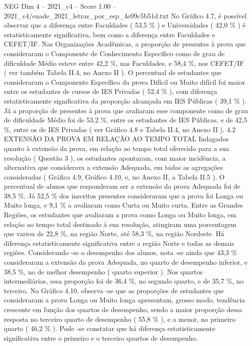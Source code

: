 \begin{textsample}{NEG Dim 4 – 2021\_c4 – Score 1.00 – 2021\_c4/enade\_2021\_letras\_por\_esp\_4c09c5b51d.txt}
No Gráfico 4.7, é possível observar que a diferença entre Faculdades ( 53,5 \% ) e Universidades ( 42,0 \% ) é estatisticamente significativa, bem como a diferença entre Faculdades e CEFET/IF.
Nas Organizações Acadêmicas, a proporção de presentes à prova que consideraram o Componente de Conhecimento Específico como de grau de dificuldade Médio esteve entre 42,2 \%, nas Faculdades, e 58,4 \%, nos CEFET/IF ( ver também Tabela II.4, no Anexo II ).
O percentual de estudantes que consideraram o Componente Específico da prova Difícil ou Muito difícil foi maior entre os estudantes de cursos de IES Privadas ( 52,4 \% ), com diferença estatisticamente significativa da proporção alcançada em IES Públicas ( 39,1 \% ).
Já a proporção de presentes à prova que avaliaram esse componente como de grau de dificuldade Médio foi de 53,2 \%, entre os estudantes de IES Públicas, e de 42,5 \%, entre os de IES Privadas ( ver Gráfico 4.8 e Tabela II.4, no Anexo II ). 4.2 EXTENSÃO DA PROVA EM RELAÇÃO AO TEMPO TOTAL Indagados quanto à extensão da prova, em relação ao tempo total oferecido para a sua resolução ( Questão 3 ), os estudantes apontaram, com maior incidência, a alternativa que considerava a extensão Adequada, em todas as agregações consideradas ( Gráfico 4.9, Gráfico 4.10, e, no Anexo II, a Tabela II.5 ).
O percentual de alunos que responderam ser a extensão da prova Adequada foi de 38,5 \%.
Já 52,5 \% dos inscritos presentes consideraram que a prova foi Longa ou Muito longa, e 9,1 \% a avaliaram como Curta ou Muito curta.
Entre as Grandes Regiões, os estudantes que avaliaram a prova como Longa ou Muito longa, em relação ao tempo total destinado à sua resolução, atingiram uma porcentagem que variou de 22,8 \%, na região Norte, até 58,3 \%, na região Nordeste.
Há diferença estatisticamente significativa entre a região Norte e todas as demais regiões.
Considerando -se o desempenho dos alunos, nota -se ainda que 43,3 \% consideraram a extensão da prova Adequada, no quarto de desempenho inferior, e 38,5 \%, no de melhor desempenho ( quarto superior ).
Nos quartos intermediários, essa proporção foi de 36,4 \%, no segundo quarto, e de 35,7 \%, no terceiro.
No Gráfico 4.10, observa -se que as proporções de estudantes que consideraram a prova Longa ou Muito longa apresentam, grosso modo, tendência crescente em função dos quartos de desempenho, sendo a maior proporção dessa resposta no terceiro quarto de desempenho ( 55,8 \% ), e a menor, no primeiro quarto ( 46,2 \% ).
Pode -se constatar que há diferença estatisticamente significativa entre o primeiro e o terceiro quartos de desempenho.

\end{textsample}
